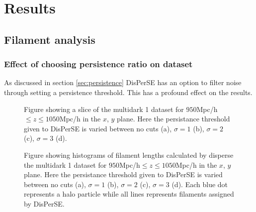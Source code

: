 \chapter{Results}

\section{Filament analysis}

\subsection{Effect of choosing persistence ratio on dataset}
As discussed in section \ref{sec:persistence} DisPerSE has an option to filter
noise through setting a persistence threshold. This has a profound effect on the
results.
\begin{figure}[htbp]\label{fig:scatterMD1}
    \hspace{1em}%
    \hspace{1em}%
    \caption{Figure showing a slice of the multidark 1 dataset for $950$Mpc/h$\leq z\leq1050$Mpc/h in the $x$, $y$ plane. Here the persistance threshold given to DisPerSE is varied between no cuts (a), $\sigma=1$ (b), $\sigma=2$ (c), $\sigma=3$ (d).}
\end{figure}
\begin{figure}[htbp]\label{fig:histMD1}
    \hspace{1em}%
    \hspace{1em}%
    \caption{Figure showing histograms of filament lengths calculated by disperse the multidark 1 dataset for $950$Mpc/h$\leq z\leq1050$Mpc/h in the $x$, $y$ plane. Here the persistance threshold given to DisPerSE is varied between no cuts (a), $\sigma=1$ (b), $\sigma=2$ (c), $\sigma=3$ (d). Each blue dot represents a halo particle while all lines represents filaments assigned by DisPerSE.}
\end{figure}
